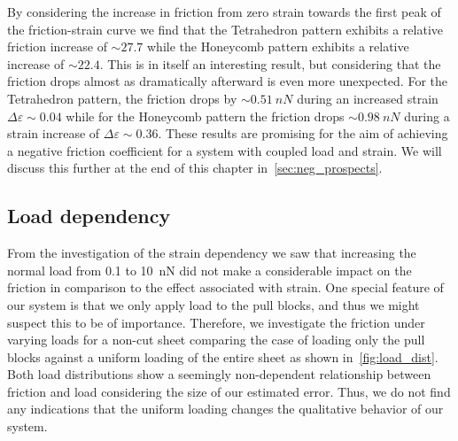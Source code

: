 By considering the increase in friction from zero strain towards the first peak
of the friction-strain curve we find that the Tetrahedron pattern exhibits a
relative friction increase of $\sim 27.7$ while the Honeycomb pattern exhibits a
relative increase of $\sim 22.4$. This is in itself an interesting result, but
considering that the friction drops almost as dramatically afterward is even more unexpected. For the Tetrahedron pattern, the friction drops by
$\sim \SI{0.51}{nN}$ during an increased strain $\Delta \varepsilon \sim 0.04$
while for the Honeycomb pattern the friction drops $\sim\SI{0.98}{nN}$ during a strain increase of $\Delta \varepsilon \sim 0.36$. These results are promising for the aim of achieving a negative friction coefficient for a system with coupled load and strain. We will discuss this further at the end of this chapter in~\cref{sec:neg_prospects}.



\subsection{Load dependency}\label{sec:load_dependency}
From the investigation of the strain dependency we saw that increasing the normal load from 0.1 to \SI{10}{nN} did not make a considerable impact on the friction in comparison to the effect associated with strain. One special feature of our system is that we only apply load to the pull blocks, and thus we might suspect this to be of importance. Therefore, we investigate the friction under varying loads for a non-cut sheet comparing the case of loading only the pull blocks against a uniform loading of the entire sheet as shown in~\cref{fig:load_dist}. Both load distributions show a seemingly non-dependent relationship between friction and load considering the size of our estimated error. Thus, we do not find any indications that the uniform loading changes the qualitative behavior of our system.

